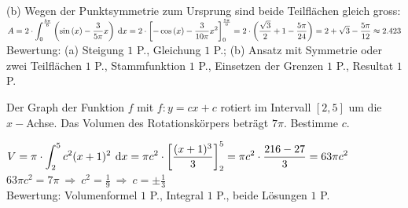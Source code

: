 \documentclass[11pt]{exam}
\begin{document}
\begin{questions}
{\begin{solution}
		(b) Wegen der Punktsymmetrie zum Ursprung sind beide Teilflächen gleich gross:\\
		$\ds A=2\*\int_0^{\frac{5\pi}{6}}\left(\sin{x}-\frac{3}{5\pi}x\right)\d{x}=2\*\left[-\cos{x}-\frac{3}{10\pi}x^2\right]_0^{\frac{5\pi}{6}}=2\*\left(\frac{\sqrt{3}}{2}+1-\frac{5\pi}{24}\right)=2+\sqrt{3}-\frac{5\pi}{12}\approx2.423$\\
		Bewertung: (a) Steigung $1$ P., Gleichung $1$ P.; (b) Ansatz mit Symmetrie oder zwei Teilflächen $1$ P., Stammfunktion $1$ P., Einsetzen der Grenzen $1$ P., Resultat $1$ P.
\end{solution}}
{}

\question[3] %
Der Graph der Funktion $f$ mit $f:y=cx+c$ rotiert im Intervall $\left[2,5\right]$ um die $x-$Achse. Das Volumen des Rotationskörpers beträgt $7\pi$. Bestimme $c$.
{\begin{solution}
		$\displaystyle V=\pi\cdot\int_2^5c^2(x+1)^2\:\operatorname{d}\!{x}=\pi c^2\cdot\left[\frac{(x+1)^3}{3}\right]_2^5=\pi c^2\cdot\frac{216-27}{3}=63\pi c^2$\\
		$63\pi c^2=7\pi\ \Rightarrow\ c^2=\frac{1}{9}\ \Rightarrow\ c=\pm\frac{1}{3}$\\
		Bewertung: Volumenformel $1$ P., Integral $1$ P., beide Lösungen $1$ P.
\end{solution}}
{}


\noaddpoints
\question[\totalpoints] %
\addpoints
\begin{minipage}{0.525\linewidth}
\end{minipage}
\end{questions}
\end{document}
